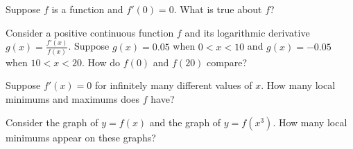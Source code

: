 \documentclass{ximera}
\newcommand{\recommendation}[1]{}
\begin{document}
\begin{shuffle}
\begin{problem}
  Suppose $f$ is a function and $f'(0) = 0$.  What is true about $f$?
  \begin{multipleChoice}
  \end{multipleChoice}
\end{problem}



\begin{problem}
  Consider a positive continuous function $f$ and its logarithmic derivative $g(x) = \frac{f'(x)}{f(x)}$.  Suppose $g(x) = 0.05$ when $0 < x < 10$ and $g(x) = -0.05$ when $10 < x < 20$.  How do $f(0)$ and $f(20)$ compare?
  \begin{multipleChoice}
  \end{multipleChoice}
\end{problem}



\begin{problem}
  Suppose $f'(x) = 0$ for infinitely many different values of $x$.  How many local minimums and maximums does $f$ have?
  \begin{multipleChoice}
  \end{multipleChoice}
\end{problem}

\begin{problem}
  Consider the graph of $y = f(x)$ and the graph of $y = f(x^3)$.  How many local minimums appear on these graphs?
  \begin{multipleChoice}
  \end{multipleChoice}
\end{problem}


\end{shuffle}
\end{document}
